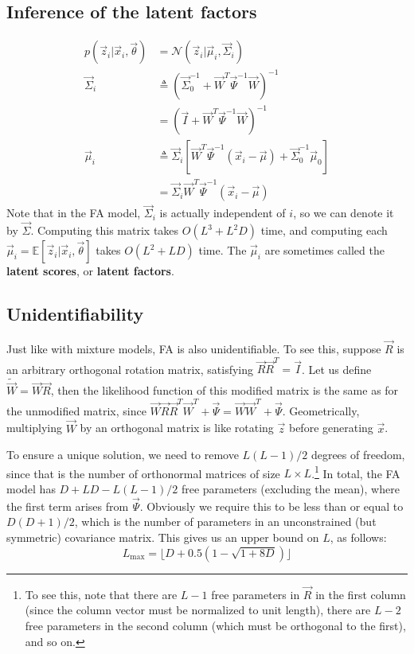 \subsection{Inference of the latent factors}
\begin{align}
p(\vec{z}_i|\vec{x}_i,\vec{\theta}) & = \mathcal{N}(\vec{z}_i|\vec{\mu}_i,\vec{\Sigma}_i) \\
\vec{\Sigma}_i & \triangleq (\vec{\Sigma}_0^{-1}+\vec{W}^T\vec{\Psi}^{-1}\vec{W})^{-1} \\
               & =(\vec{I}+\vec{W}^T\vec{\Psi}^{-1}\vec{W})^{-1} \\
\vec{\mu}_i & \triangleq \vec{\Sigma}_i[\vec{W}^T\vec{\Psi}^{-1}(\vec{x}_i-\vec{\mu})+\vec{\Sigma}_0^{-1}\vec{\mu}_0] \\
            & =\vec{\Sigma}_i\vec{W}^T\vec{\Psi}^{-1}(\vec{x}_i-\vec{\mu})
\end{align}
Note that in the FA model, $\vec{\Sigma}_i$ is actually independent of $i$, so we can denote it by $\vec{\Sigma}$. Computing this matrix takes $O(L^3+L^2D)$ time, and computing each $\vec{\mu}_i=\mathbb{E}[\vec{z}_i|\vec{x}_i,\vec{\theta}]$ takes $O(L^2+LD)$ time. The $\vec{\mu}_i$ are sometimes called the \textbf{latent scores}, or \textbf{latent factors}.


\subsection{Unidentifiability}
Just like with mixture models, FA is also unidentifiable. To see this, suppose $\vec{R}$ is an arbitrary orthogonal rotation matrix, satisfying $\vec{R}\vec{R}^T=\vec{I}$. Let us define $\tilde{\vec{W}}=\vec{W}\vec{R}$, then the likelihood function of this modified matrix is the same as for the unmodified matrix, since $\vec{W}\vec{R}\vec{R}^T\vec{W}^T+\vec{\Psi}=\vec{W}\vec{W}^T+\vec{\Psi}$. Geometrically, multiplying $\vec{W}$ by an orthogonal matrix is like rotating $\vec{z}$ before generating $\vec{x}$.

To ensure a unique solution, we need to remove $L(L-1)/2$ degrees of freedom, since that is the number of orthonormal matrices of size $L \times L$.\footnote{To see this, note that there are $L-1$ free parameters in $\vec{R}$ in the first column (since the column vector must be normalized to unit length), there are $L-2$ free parameters in the second column (which must be orthogonal to the first), and so on.} In total, the FA model has $D+LD-L(L-1)/2$ free parameters (excluding the mean), where the first term arises from $\vec{\Psi}$. Obviously we require this to be less than or equal to $D(D+1)/2$, which is the number of parameters in an unconstrained (but symmetric) covariance matrix. This gives us an upper bound on $L$, as follows:
\begin{equation}
L_{\mathrm{max}}=\lfloor D+0.5(1-\sqrt{1+8D}) \rfloor
\end{equation}

